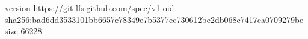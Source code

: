 version https://git-lfs.github.com/spec/v1
oid sha256:bad6dd3533101bb6657c78349e7b5377ec730612be2db068c7417ca0709279be
size 66228
